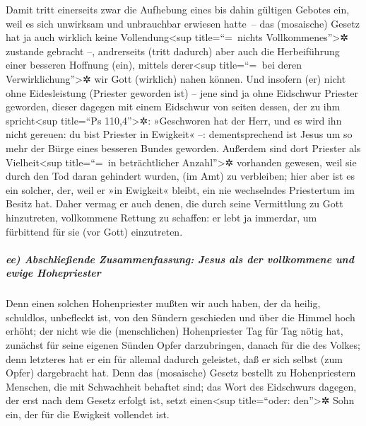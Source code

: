  Damit tritt einerseits zwar die Aufhebung eines bis
dahin gültigen Gebotes ein, weil es sich unwirksam und unbrauchbar
erwiesen hatte~--  das (mosaische) Gesetz hat ja auch
wirklich keine Vollendung\textless sup title=``=~nichts
Vollkommenes''\textgreater✲ zustande gebracht --, andrerseits (tritt
dadurch) aber auch die Herbeiführung einer besseren Hoffnung (ein),
mittels derer\textless sup title=``=~bei deren
Verwirklichung''\textgreater✲ wir Gott (wirklich) nahen können.
 Und insofern (er) nicht ohne Eidesleistung (Priester
geworden ist) -- jene sind ja ohne Eidschwur Priester geworden,
 dieser dagegen mit einem Eidschwur von seiten dessen,
der zu ihm spricht\textless sup title=``Ps 110,4''\textgreater✲:
»Geschworen hat der Herr, und es wird ihn nicht gereuen: du bist
Priester in Ewigkeit« --:  dementsprechend ist Jesus um
so mehr der Bürge eines besseren Bundes geworden. 
Außerdem sind dort Priester als Vielheit\textless sup title=``=~in
beträchtlicher Anzahl''\textgreater✲ vorhanden gewesen, weil sie durch
den Tod daran gehindert wurden, (im Amt) zu verbleiben; 
hier aber ist es ein solcher, der, weil er »in Ewigkeit« bleibt, ein nie
wechselndes Priestertum im Besitz hat.  Daher vermag er
auch denen, die durch seine Vermittlung zu Gott hinzutreten, vollkommene
Rettung zu schaffen: er lebt ja immerdar, um fürbittend für sie (vor
Gott) einzutreten.

\hypertarget{ee-abschlieuxdfende-zusammenfassung-jesus-als-der-vollkommene-und-ewige-hohepriester}{%
\subparagraph{ee) Abschließende Zusammenfassung: Jesus als der
vollkommene und ewige
Hohepriester}\label{ee-abschlieuxdfende-zusammenfassung-jesus-als-der-vollkommene-und-ewige-hohepriester}}

 Denn einen solchen Hohenpriester mußten wir auch haben,
der da heilig, schuldlos, unbefleckt ist, von den Sündern geschieden und
über die Himmel hoch erhöht;  der nicht wie die
(menschlichen) Hohenpriester Tag für Tag nötig hat, zunächst für seine
eigenen Sünden Opfer darzubringen, danach für die des Volkes; denn
letzteres hat er ein für allemal dadurch geleistet, daß er sich selbst
(zum Opfer) dargebracht hat.  Denn das (mosaische) Gesetz
bestellt zu Hohenpriestern Menschen, die mit Schwachheit behaftet sind;
das Wort des Eidschwurs dagegen, der erst nach dem Gesetz erfolgt ist,
setzt einen\textless sup title=``oder: den''\textgreater✲ Sohn ein, der
für die Ewigkeit vollendet ist.

